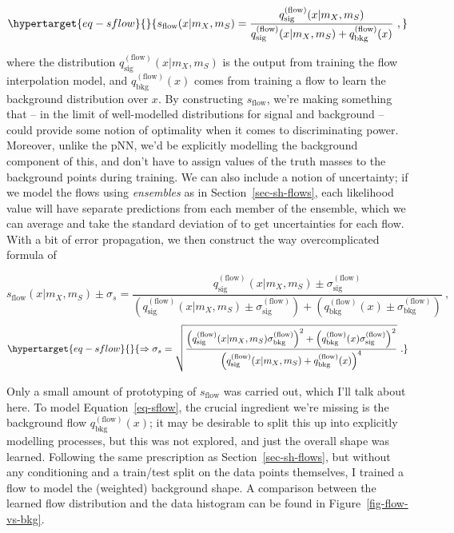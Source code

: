 \documentclass[
  11pt,
  numbers=noendperiod]{book}
\begin{document}
\begin{equation}\protect\hypertarget{eq-sflow}{}{
s_{\text{flow}}(x | m_X, m_S) = \frac{q^{({\text{flow}})}_{\text{sig}}(x |m_X, m_S)}{q^{({\text{flow}})}_{\text{sig}}(x  |m_X, m_S) + q^{({\text{flow}})}_{\text{bkg}}(x)}~,
}\label{eq-sflow}\end{equation}

where the distribution \(q^{({\text{flow}})}_{\text{sig}}(x |m_X, m_S)\)
is the output from training the flow interpolation model, and
\(q^{({\text{flow}})}_{\text{bkg}}(x)\) comes from training a flow to
learn the background distribution over \(x\). By constructing
\(s_{\text{flow}}\), we're making something that -- in the limit of
well-modelled distributions for signal and background -- could provide
some notion of optimality when it comes to discriminating power.
Moreover, unlike the pNN, we'd be explicitly modelling the background
component of this, and don't have to assign values of the truth masses
to the background points during training. We can also include a notion
of uncertainty; if we model the flows using \emph{ensembles} as in
Section~\ref{sec-sh-flows}, each likelihood value will have separate
predictions from each member of the ensemble, which we can average and
take the standard deviation of to get uncertainties for each flow. With
a bit of error propagation, we then construct the way overcomplicated
formula of

\[
s_{\text{flow}}(x | m_X, m_S) \pm \sigma_{s} = \frac{q^{({\text{flow}})}_{\text{sig}}(x |m_X, m_S) \pm \sigma^{({\text{flow}})}_{\text{sig}}}{\left(q^{({\text{flow}})}_{\text{sig}}(x  |m_X, m_S) \pm \sigma^{({\text{flow}})}_{\text{sig}}\right) + \left(q^{({\text{flow}})}_{\text{bkg}}(x) \pm \sigma^{({\text{flow}})}_{\text{bkg}}\right)}~,
\] \begin{equation}\protect\hypertarget{eq-sflow}{}{
\Rightarrow  \sigma_{s} = \sqrt{\frac{\left(q^{({\text{flow}})}_{\text{sig}}(x |m_X, m_S) \sigma^{({\text{flow}})}_{\text{bkg}}\right)^2 + \left(q^{({\text{flow}})}_{\text{bkg}}(x) \sigma^{({\text{flow}})}_{\text{sig}}\right)^2}{\left( q^{({\text{flow}})}_{\text{sig}}(x |m_X, m_S) + q^{({\text{flow}})}_{\text{bkg}}(x) \right)^4}}~.
}\label{eq-sflow}\end{equation}

Only a small amount of prototyping of \(s_{\text{flow}}\) was carried
out, which I'll talk about here. To model Equation~\ref{eq-sflow}, the
crucial ingredient we're missing is the background flow
\(q^{({\text{flow}})}_{\text{bkg}}(x)\); it may be desirable to split
this up into explicitly modelling processes, but this was not explored,
and just the overall shape was learned. Following the same prescription
as Section~\ref{sec-sh-flows}, but without any conditioning and a
train/test split on the data points themselves, I trained a flow to
model the (weighted) background shape. A comparison between the learned
flow distribution and the data histogram can be found in
Figure~\ref{fig-flow-vs-bkg}.
\end{document}
